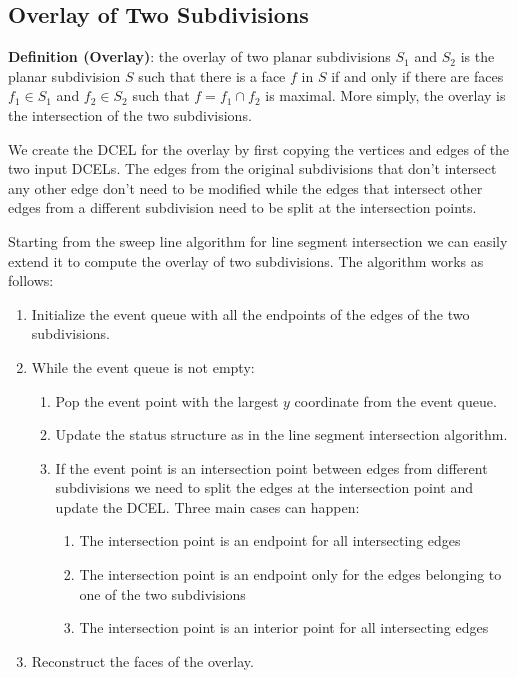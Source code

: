 \subsection{Overlay of Two Subdivisions}
\label{sec:overlay}
\textbf{Definition (Overlay)}: the overlay of two planar subdivisions $S_1$ and $S_2$ is the planar subdivision $S$ such that there is a face $f$ in $S$ if and only if there are faces $f_1 \in S_1$ and $f_2 \in S_2$ such that $f = f_1 \cap f_2$ is maximal. More simply, the overlay is the intersection of the two subdivisions.

We create the DCEL for the overlay by first copying the vertices and edges of the two input DCELs. The edges from the original subdivisions that don't intersect any other edge don't need to be modified while the edges that intersect other edges from a different subdivision need to be split at the intersection points.

Starting from the sweep line algorithm for line segment intersection we can easily extend it to compute the overlay of two subdivisions. The algorithm works as follows:
\begin{enumerate}
    \item Initialize the event queue with all the endpoints of the edges of the two subdivisions.
    \item While the event queue is not empty:
          \begin{enumerate}
              \item Pop the event point with the largest $y$ coordinate from the event queue.
              \item Update the status structure as in the line segment intersection algorithm.
              \item If the event point is an intersection point between edges from different subdivisions we need to split the edges at the intersection point and update the DCEL. Three main cases can happen:
                    \begin{enumerate}
                        \item The intersection point is an endpoint for all intersecting edges
                        \item The intersection point is an endpoint only for the edges belonging to one of the two subdivisions
                        \item The intersection point is an interior point for all intersecting edges
                    \end{enumerate}
          \end{enumerate}
    \item Reconstruct the faces of the overlay.
\end{enumerate}

